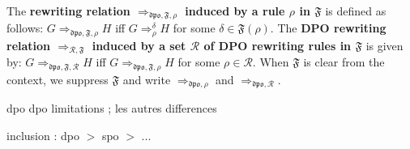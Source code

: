 \begin{definition}
  The \textbf{rewriting relation $\Rightarrow_{\mathfrak{dpo},\mathfrak{F},\rho}$ induced by a rule $\rho$ in $\mathfrak{F}$} is defined as follows: $G \Rightarrow_{\mathfrak{dpo},\mathfrak{F},\rho} H$ iff $G \Rightarrow_\rho^\delta H$ for some $\delta \in \mathfrak{F}(\rho)$. 
     The \textbf{DPO rewriting relation $\Rightarrow_{\mathcal{R},\mathfrak{F}}$ induced by a set $\mathcal{R}$ of DPO rewriting rules in $\mathfrak{F}$} is given by: $G \Rightarrow_{\mathfrak{dpo}, \mathfrak{F},\mathcal{R}} H$ iff $G \Rightarrow_{\mathfrak{dpo},\mathfrak{F}, \rho} H$ for some $\rho \in \mathcal{R}$. When $\mathfrak{F}$ is clear from the context, we 
    suppress $\mathfrak{F}$ and 
    write $\Rightarrow_{\mathfrak{dpo},\rho}$ and $\Rightarrow_{\mathfrak{dpo},\mathcal{R}}$.
\end{definition}
\color{red}    


dpo
dpo limitations ;
les autres differences

\begin{proposition}[to do]
    inclusion : dpo $>$ spo $>$ ...
\end{proposition}

